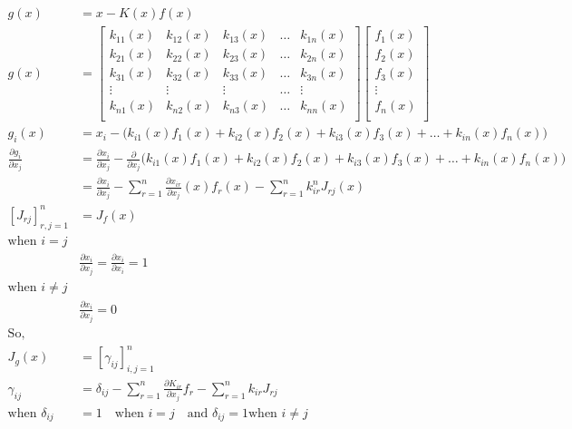 \documentclass{article}
\begin{document}
\begin{align*}
    g(x) &= x- K(x)f(x)\\
    g(x) &= 
    \begin{bmatrix} 
    k_{11}(x) & k_{12}(x) &  k_{13}(x) & \dots &  k_{1n}(x) \\[1ex]
    k_{21}(x) & k_{22}(x) &  k_{23}(x) & \dots &  k_{2n}(x) \\[1ex]
    k_{31}(x) & k_{32}(x) &  k_{33}(x) & \dots &  k_{3n}(x) \\[1ex]
    \vdots & \vdots & \vdots & \dots & \vdots \\[1ex]
    k_{n1}(x) & k_{n2}(x) &  k_{n3}(x) & \dots &  k_{nn}(x) \\[1ex]
    \end{bmatrix}
    \begin{bmatrix}
    f_1(x)\\[1ex]
    f_2(x)\\[1ex]
    f_3(x)\\[1ex]
    \vdots \\[1ex]
    f_n(x)\\[1ex]
    \end{bmatrix}\\
    g_i(x) &= x_i - \bigg( k_{i1}(x)f_1(x)+k_{i2}(x)f_2(x) + k_{i3}(x)f_3(x) + \dots + k_{in}(x)f_n(x)\bigg)\\
    \frac{\partial g_i}{\partial x_j} &= \frac{\partial x_i}{\partial x_j} - \frac{\partial}{\partial x_j}\bigg( k_{i1}(x)f_1(x)+k_{i2}(x)f_2(x) + k_{i3}(x)f_3(x) + \dots + k_{in}(x)f_n(x)\bigg)\\
    &= \frac{\partial x_i}{\partial x_j} - \sum_{r=1}^n \frac{\partial x_{ir}}{\partial x_j}(x) f_r (x) - \sum_{r=1}^n k_{ir}^n J_{rj}(x)\\ 
    [J_{rj}]_{r,j=1}^n &= J_f(x) \\
    \text{when $i=j$}&\\
    & \frac{\partial x_i}{\partial x_j} =  \frac{\partial x_i}{\partial x_i} = 1 \\
     \text{when $i\ne j$}&\\
     &\frac{\partial x_i}{\partial x_j}  = 0 \\
     \text{So,}&\\
     J_g(x) &= [\gamma_{ij}]_{i,j=1}^n\\
     \gamma_{ij} &= \delta_{ij} - \sum_{r=1}^n \frac{\partial K_{ir}}{\partial x_j}f_r - \sum_{r=1}^n k_{ir}J_{rj}\\
     \text{when }\delta_{ij}&= 1 \quad \text{when }i=j \quad \text{and }\delta_{ij}= 1  \text{when } i \ne j \\
\end{align*}
\end{document}
